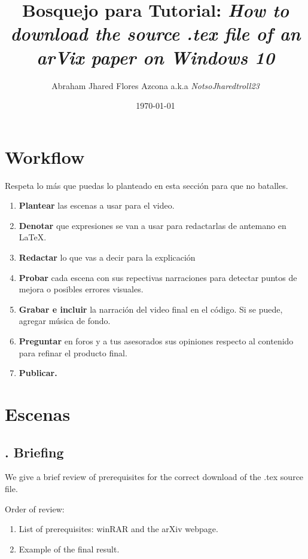 \documentclass[letterpaper, 12pt]{article}
\title{Bosquejo para \textbf{Tutorial:} 
    {\fontfamily{qag}\selectfont
        \emph{How to download the source .tex file of an arVix paper on Windows 10}
    }
}
\author{Abraham Jhared Flores Azcona a.k.a \emph{NotsoJharedtroll23}}
\date{\today}
\begin{document}
\maketitle
\thispagestyle{empty}
\section*{Workflow}
Respeta lo más que puedas lo planteado en esta sección para que no batalles.
    \begin{enumerate}
        \item \textbf{Plantear} las escenas a usar para el video.
        \item \textbf{Denotar} que expresiones se van a usar para redactarlas de antemano en \LaTeX.
        \item \textbf{Redactar} lo que vas a decir para la explicación
        \item \textbf{Probar} cada escena con sus repectivas narraciones para detectar puntos de mejora o posibles errores visuales.
        \item \textbf{Grabar e incluir} la narración del video final en el código. Si se puede, agregar música de fondo.
        \item \textbf{Preguntar} en foros y a tus asesorados sus opiniones respecto al contenido para refinar el producto final.
        \item \textbf{Publicar.}
    \end{enumerate}\par
\section*{Escenas}
\subsection*{{. Briefing}}
We give a brief review of prerequisites for the correct download of the .tex source file.\par
Order of review:
\begin{enumerate}
    \item List of prerequisites: winRAR and the arXiv webpage.
    \item Example of the final result.
\end{enumerate}
\end{document}
